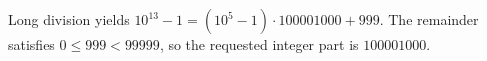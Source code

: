 Long division yields $10^{13}-1=(10^5-1)\cdot100001000+999$. The remainder satisfies $0\le999<99999$, so the requested integer part is $\boxed{100001000}$.
